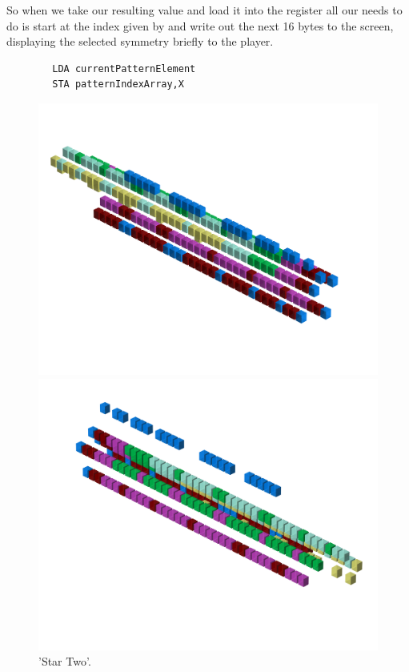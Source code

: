 So when we take our resulting value and load it into the  register all our  needs to do is start at the 
index given by  and write out the next 16 bytes to the screen, displaying the selected symmetry briefly to the player.
\begin{lstlisting}
        LDA currentPatternElement
        STA patternIndexArray,X
\end{lstlisting}
\clearpage
\begin{figure}[H]
    \centering
    \begin{adjustbox}{width=12cm,center}
      \includegraphics[width=12cm]{src/patterns/pattern3-45.png}%
    \end{adjustbox}
    \begin{adjustbox}{width=12cm,margin=0cm -4cm}
      \includegraphics[width=12cm]{src/patterns/pattern3-225.png}%
    \end{adjustbox}
\caption{'Star Two'.}
\end{figure}
\clearpage

